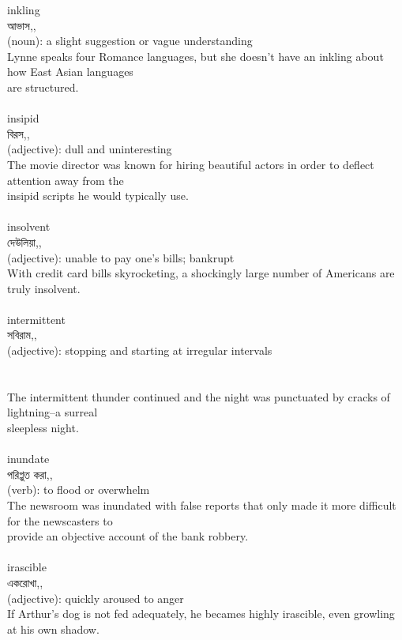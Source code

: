 \documentclass{article}
\begin{document}
{inkling}\\
{আভাস,,}\\
{(noun): a slight suggestion or vague understanding\\Lynne speaks four Romance languages, but she doesn't have an inkling about how East Asian languages\\are structured.\\}\\
{insipid}\\
{বিরস,,}\\
{(adjective): dull and uninteresting\\The movie director was known for hiring beautiful actors in order to deflect attention away from the\\insipid scripts he would typically use.\\}\\
{insolvent}\\
{দেউলিয়া,,}\\
{(adjective): unable to pay one's bills; bankrupt\\With credit card bills skyrocketing, a shockingly large number of Americans are truly insolvent.\\}\\
{intermittent}\\
{সবিরাম,,}\\
{(adjective): stopping and starting at irregular intervals\\\\                                                                                \\The intermittent thunder continued and the night was punctuated by cracks of lightning--a surreal\\sleepless night.\\}\\
{inundate}\\
{পরিপ্লুত করা,,}\\
{(verb): to flood or overwhelm\\The newsroom was inundated with false reports that only made it more difficult for the newscasters to\\provide an objective account of the bank robbery.\\}\\
{irascible}\\
{একরোখা,,}\\
{(adjective): quickly aroused to anger\\If Arthur's dog is not fed adequately, he becames highly irascible, even growling at his own shadow.\\}\\
\end{document}
